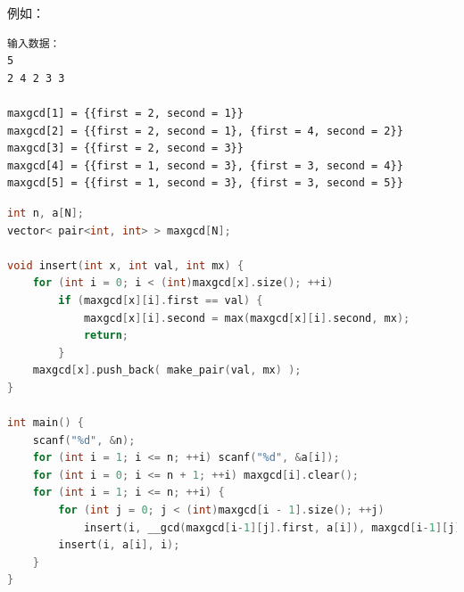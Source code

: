 \documentclass{article}
\begin{document}
例如：

\begin{lstlisting}
输入数据：
5
2 4 2 3 3

maxgcd[1] = {{first = 2, second = 1}}
maxgcd[2] = {{first = 2, second = 1}, {first = 4, second = 2}}
maxgcd[3] = {{first = 2, second = 3}}
maxgcd[4] = {{first = 1, second = 3}, {first = 3, second = 4}}
maxgcd[5] = {{first = 1, second = 3}, {first = 3, second = 5}}

\end{lstlisting}

\begin{lstlisting}[language=C++]
int n, a[N];
vector< pair<int, int> > maxgcd[N];

void insert(int x, int val, int mx) {
	for (int i = 0; i < (int)maxgcd[x].size(); ++i)
		if (maxgcd[x][i].first == val) {
			maxgcd[x][i].second = max(maxgcd[x][i].second, mx);
			return;
		}
	maxgcd[x].push_back( make_pair(val, mx) );
}

int main() {
	scanf("%d", &n);
	for (int i = 1; i <= n; ++i) scanf("%d", &a[i]);
	for (int i = 0; i <= n + 1; ++i) maxgcd[i].clear();
	for (int i = 1; i <= n; ++i) {
		for (int j = 0; j < (int)maxgcd[i - 1].size(); ++j)
			insert(i, __gcd(maxgcd[i-1][j].first, a[i]), maxgcd[i-1][j].second);
		insert(i, a[i], i);
	}
}
\end{lstlisting}
\end{document}
